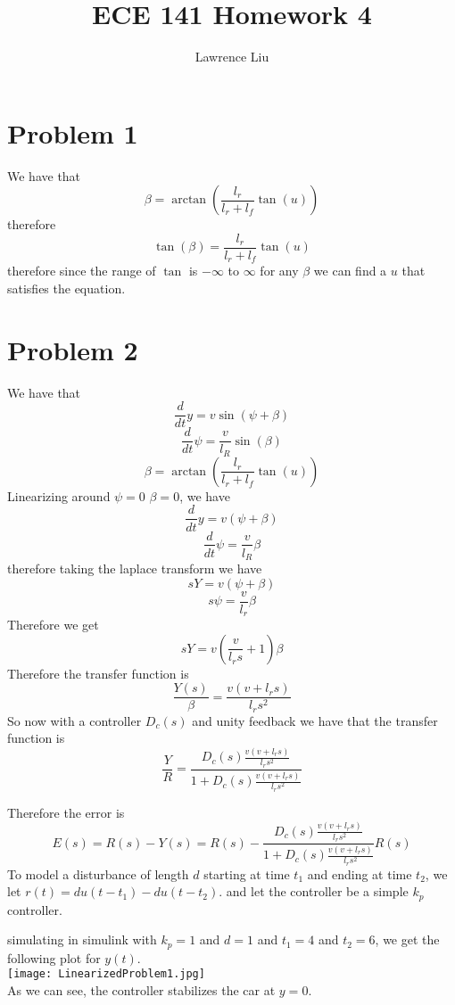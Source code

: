 \documentclass[12pt]{article}
\title{ECE 141 Homework 4}
\author{Lawrence Liu}
\begin{document}
\maketitle
\section*{Problem 1}
We have that $$\beta=\arctan(\frac{l_r}{l_r+l_f}\tan(u))$$
therefore
$$\tan(\beta)=\frac{l_r}{l_r+l_f}\tan(u)$$
therefore since the range of $\tan$ is $-\infty$ to $\infty$ for any $\beta$ we can find a $u$ that satisfies the equation.

\section*{Problem 2}
We have that
$$\frac{d}{dt}y=v\sin(\psi+\beta)$$
$$\frac{d}{dt}\psi=\frac{v}{l_R}\sin(\beta)$$
$$\beta=\arctan(\frac{l_r}{l_r+l_f}\tan(u))$$
Linearizing around $\psi=0$ $\beta=0$, we have
$$\frac{d}{dt}y=v(\psi+\beta)$$
$$\frac{d}{dt}\psi=\frac{v}{l_R}\beta$$
therefore taking the laplace transform we have
$$sY=v(\psi+\beta)$$
$$s\psi=\frac{v}{l_r}\beta$$
Therefore we get
$$sY=v(\frac{v}{l_r s}+1)\beta$$
Therefore the transfer function is
$$\frac{Y(s)}{\beta}=\frac{v(v+l_r s)}{l_r s^2}$$
So now with a controller $D_c(s)$ and unity feedback we have that the transfer function is
$$\frac{Y}{R}=\frac{D_c(s)\frac{v(v+l_r s)}{l_r s^2}}{1+D_c(s)\frac{v(v+l_r s)}{l_r s^2}}$$

Therefore the error is
$$E(s)=R(s)-Y(s)=R(s)-\frac{D_c(s)\frac{v(v+l_r s)}{l_r s^2}}{1+D_c(s)\frac{v(v+l_r s)}{l_r s^2}}R(s)$$
To model a disturbance of length $d$ starting at time $t_1$ and ending at time $t_2$, we let $r(t)=du(t-t_1)-du(t-t_2)$.
and let the controller be a simple $k_p$ controller.

simulating in simulink with $k_p=1$ and $d=1$ and $t_1=4$ and $t_2=6$, we get the following plot for $y(t)$.\\
\texttt{[image: LinearizedProblem1.jpg]}
\\As we can see, the controller stabilizes the car at $y=0$.
\end{document}
